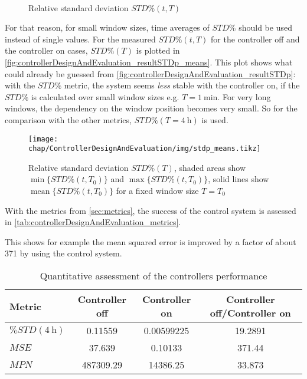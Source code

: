 \begin{figure}[tb]
    \centering
        \\
       \caption{Relative standard deviation $STD\%(t,T)$}
    \label{fig:controllerDesignAndEvaluation_resultSTDp}
\end{figure}

For that reason, for small window sizes, time averages of $STD\%$ should be used instead of single values. For the measured $STD\%(t,T)$ for the controller off and the controller on cases, $STD\%(T)$ is plotted in \autoref{fig:controllerDesignAndEvaluation_resultSTDp_means}. This plot shows what could already be guessed from \autoref{fig:controllerDesignAndEvaluation_resultSTDp}: with the $STD\%$ metric, the system seems \textit{less} stable with the controller on, if the $STD\%$ is calculated over small window sizes e.g. $T=\SI{1}{\minute}$. For very long windows, the dependency on the window position becomes very small. So for the comparison with the other metrics, $STD\%(T=\SI{4}{\hour})$ is used.

\begin{figure}[tb]
	\centering
	\texttt{[image: chap/ControllerDesignAndEvaluation/img/stdp\_means.tikz]}
	\caption{Relative standard deviation $STD\%(T)$, shaded areas show $\operatorname{min}\{STD\%(t,T_0)\}$ and $\operatorname{max}\{STD\%(t,T_0)\}$, solid lines show $\operatorname{mean}\{STD\%(t,T_0)\}$ for a fixed window size $T=T_0$}
	\label{fig:controllerDesignAndEvaluation_resultSTDp_means}
\end{figure}


With the metrics from \autoref{sec:metrics}, the success of the control system is assessed in \autoref{tab:controllerDesignAndEvaluation_metrics}.

This shows for example the mean squared error is improved by a factor of about \num{371} by using the control system.

\begin{table}[tbh]
\centering
\caption{Quantitative assessment of the controllers performance}\label{tab:controllerDesignAndEvaluation_metrics}
\begin{tabular}{lSSS}
	\toprule
	Metric                 & {Controller off} & {Controller on} & {Controller off/Controller on} \\ \midrule
	$\%STD(\SI{4}{\hour})$ & 0.11559          & 0.00599225      & 19.2891                        \\
	$MSE$                  & 37.639           & 0.10133         & 371.44                         \\
	$MPN$                  & 487309.29        & 14386.25        & 33.873                         \\ \bottomrule
\end{tabular}
\end{table}

